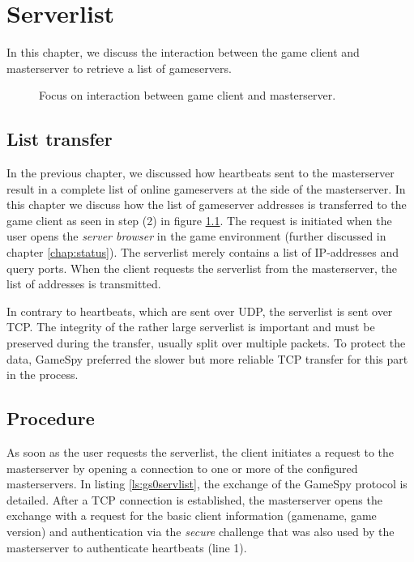 \chapter{Serverlist}
\label{chap:serverlist}

In this chapter, we discuss the interaction between the game client and masterserver to retrieve a list of gameservers.

\begin{figure}[h]
\centering

\caption{Focus on interaction between game client and masterserver.}
\label{fig:overviewcms}
\end{figure}

\section{List transfer}
In the previous chapter, we discussed how heartbeats sent to the masterserver result in a complete list of online gameservers at the side of the masterserver. In this chapter we discuss how the list of gameserver addresses is transferred to the game client as seen in step (2) in figure \ref{fig:overviewcms}. The request is initiated when the user opens the \emph{server browser} in the game environment (further discussed in chapter \ref{chap:status}). The serverlist merely contains a list of IP-addresses and query ports. When the client requests the serverlist from the masterserver, the list of addresses is transmitted.

In contrary to heartbeats, which are sent over UDP, the serverlist is sent over TCP. The integrity of the rather large serverlist is important and must be preserved during the transfer, usually split over multiple packets. To protect the data, GameSpy preferred the slower but more reliable TCP transfer for this part in the process.


\section{Procedure}
As soon as the user requests the serverlist, the client initiates a request to the masterserver by opening a connection to one or more of the configured masterservers. In listing \ref{ls:gs0servlist}, the exchange of the GameSpy protocol is detailed. After a TCP connection is established, the masterserver opens the exchange with a request for the basic client information (gamename, game version) and authentication via the \emph{secure} challenge that was also used by the masterserver to authenticate heartbeats (line 1).

